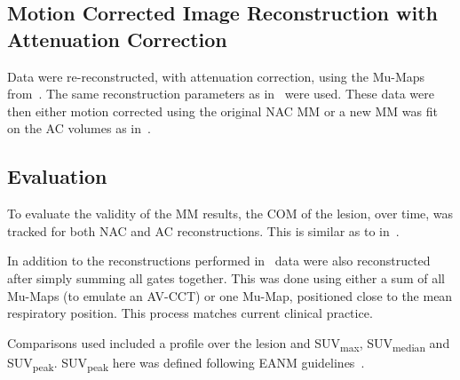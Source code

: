             \subsection{Motion Corrected Image Reconstruction with Attenuation Correction} \label{sec:pet_ct_respiratory_motion_correction_with_a_single_attenuation_map_using_nac_derived_deformation_fields_methods_attenuation_corrected_image_reconstruction}
                Data were re-reconstructed, with attenuation correction, using the \glspl{Mu-Map} from~. The same reconstruction parameters as in~ were used. These data were then either motion corrected using the original \gls{NAC} \gls{MM} or a new \gls{MM} was fit on the \gls{AC} volumes as in~.
            
            \subsection{Evaluation} \label{sec:pet_ct_respiratory_motion_correction_with_a_single_attenuation_map_using_nac_derived_deformation_fields_methods_evaluation}
                To evaluate the validity of the \gls{MM} results, the \gls{COM} of the lesion, over time, was tracked for both \gls{NAC} and \gls{AC} reconstructions. This is similar as to in~.
                
                In addition to the reconstructions performed in~ data were also reconstructed after simply summing all gates together. This was done using either a sum of all \glspl{Mu-Map} (to emulate an \gls{AV-CCT}) or one \gls{Mu-Map}, positioned close to the mean respiratory position. This process matches current clinical practice. 
                
                Comparisons used included a profile over the lesion and \gls{SUV}\textsubscript{max}, \gls{SUV}\textsubscript{median} and \gls{SUV}\textsubscript{peak}. \gls{SUV}\textsubscript{peak} here was defined following \gls{EANM} guidelines~\parencite{Boellaard2015FDG2.0}.
            
